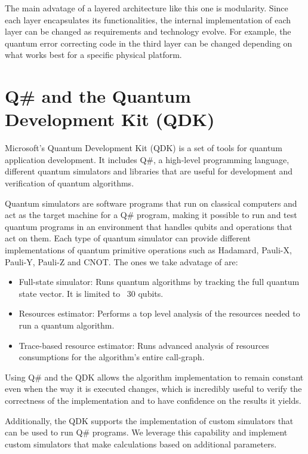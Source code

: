 The main advatage of a layered architecture like this one is modularity. Since each layer encapsulates its functionalities, the internal implementation of each layer can be changed as requirements and technology evolve. For example, the quantum error correcting code in the third layer can be changed depending on what works best for a specific physical platform.

\section{Q\# and the Quantum Development Kit (QDK)}

Microsoft's Quantum Development Kit (QDK)\cite{MicrosoftQuantumDevelopmentKit} is a set of tools for quantum application development. It includes Q\#, a high-level programming language, different quantum simulators and libraries that are useful for development and verification of quantum algorithms.

Quantum simulators are software programs that run on classical computers and act as the target machine for a Q\# program, making it possible to run and test quantum programs in an environment that handles qubits and operations that act on them\cite{QDKSimulators}. Each type of quantum simulator can provide different implementations of quantum primitive operations such as Hadamard, Pauli-X, Pauli-Y, Pauli-Z and CNOT. The ones we take advatage of are:
\begin{itemize}
    \item Full-state simulator: Runs quantum algorithms by tracking the full quantum state vector. It is limited to ~30 qubits.
    \item Resources estimator: Performs a top level analysis of the resources needed to run a quantum algorithm.
    \item Trace-based resource estimator: Runs advanced analysis of resources consumptions for the algorithm's entire call-graph.
\end{itemize}

Using Q\# and the QDK allows the algorithm implementation to remain constant even when the way it is executed changes, which is incredibly useful to verify the correctness of the implementation and to have confidence on the results it yields.

Additionally, the QDK supports the implementation of custom simulators that can be used to run Q\# programs. We leverage this capability and implement custom simulators that make calculations based on additional parameters.

